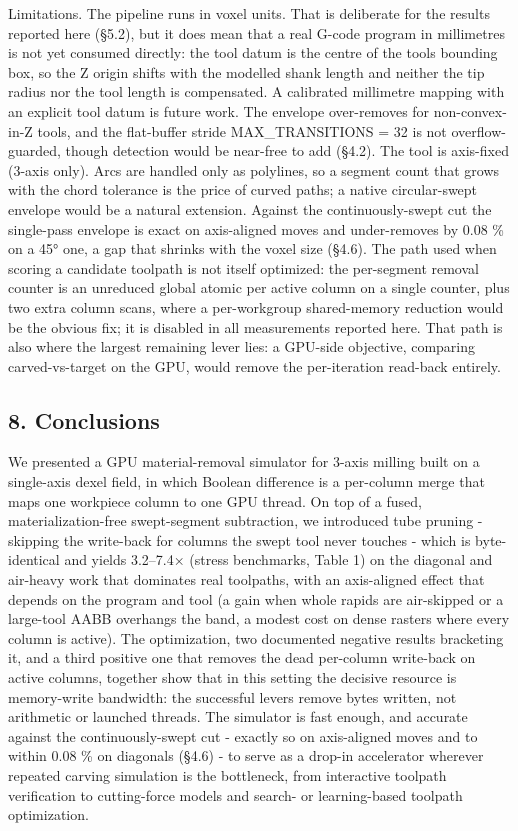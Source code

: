 \documentclass[
]{article}
\begin{document}
Limitations. The pipeline runs in voxel units. That is deliberate for
the results reported here (§5.2), but it does mean that a real G-code
program in millimetres is not yet consumed directly: the tool datum is
the centre of the tool\textquotesingle s bounding box, so the Z origin
shifts with the modelled shank length and neither the tip radius nor the
tool length is compensated. A calibrated millimetre mapping with an
explicit tool datum is future work. The envelope over-removes for
non-convex-in-Z tools, and the flat-buffer stride MAX\_TRANSITIONS = 32
is not overflow-guarded, though detection would be near-free to add
(§4.2). The tool is axis-fixed (3-axis only). Arcs are handled only as
polylines, so a segment count that grows with the chord tolerance is the
price of curved paths; a native circular-swept envelope would be a
natural extension. Against the continuously-swept cut the single-pass
envelope is exact on axis-aligned moves and under-removes by 0.08 \% on
a 45° one, a gap that shrinks with the voxel size (§4.6). The path used
when scoring a candidate toolpath is not itself optimized: the
per-segment removal counter is an unreduced global atomic per active
column on a single counter, plus two extra column scans, where a
per-workgroup shared-memory reduction would be the obvious fix; it is
disabled in all measurements reported here. That path is also where the
largest remaining lever lies: a GPU-side objective, comparing
carved-vs-target on the GPU, would remove the per-iteration read-back
entirely.

\hypertarget{conclusions}{%
\subsection{8. Conclusions}\label{conclusions}}

We presented a GPU material-removal simulator for 3-axis milling built
on a single-axis dexel field, in which Boolean difference is a
per-column merge that maps one workpiece column to one GPU thread. On
top of a fused, materialization-free swept-segment subtraction, we
introduced tube pruning - skipping the write-back for columns the swept
tool never touches - which is byte-identical and yields 3.2--7.4×
(stress benchmarks, Table 1) on the diagonal and air-heavy work that
dominates real toolpaths, with an axis-aligned effect that depends on
the program and tool (a gain when whole rapids are air-skipped or a
large-tool AABB overhangs the band, a modest cost on dense rasters where
every column is active). The optimization, two documented negative
results bracketing it, and a third positive one that removes the dead
per-column write-back on active columns, together show that in this
setting the decisive resource is memory-write bandwidth: the successful
levers remove bytes written, not arithmetic or launched threads. The
simulator is fast enough, and accurate against the continuously-swept
cut - exactly so on axis-aligned moves and to within 0.08 \% on
diagonals (§4.6) - to serve as a drop-in accelerator wherever repeated
carving simulation is the bottleneck, from interactive toolpath
verification to cutting-force models and search- or learning-based
toolpath optimization.
\end{document}
